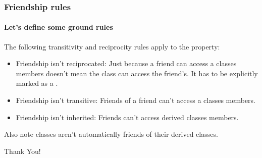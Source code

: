 \documentclass{beamer}
\begin{document}
\begin{frame}
  \frametitle{Friendship rules}
  \framesubtitle{Let's define some ground rules}
  
  The following transitivity and reciprocity rules apply to the  property:
  \begin{itemize}
  	\item{Friendship isn't reciprocated: Just because a friend can access a classes  members doesn't mean the class can access the friend's.  It has to be explicitly marked as a .}\pause
  	\item{Friendship isn't transitive: Friends of a friend can't access a classes  members.}\pause
    \item{Friendship isn't inherited:  Friends can't access derived classes  members.}
  \end{itemize}
  \pause Also note classes aren't automatically friends of their derived classes.

\end{frame}  
\begin{frame}
	\begin{center}
		\Large{Thank You!}
	\end{center}
\end{frame}
\end{document}
